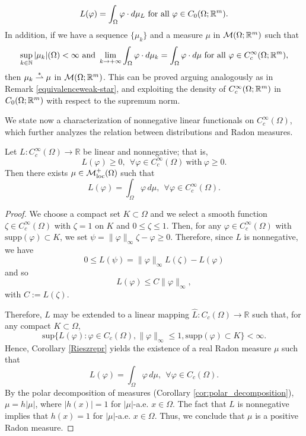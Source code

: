 \begin{remark}
\begin{equation*}
L(\varphi) = \int_{\Omega} \varphi \cdot d \mu_{L} \text{ for all } \varphi \in C_{0}(\Omega; \mathbb{R}^{m}).
\end{equation*}
In addition, if we have a sequence $\{\mu_{k}\}$ and a measure $\mu$ in $\mathcal{M}(\Omega; \mathbb{R}^{m})$ such that
\begin{equation*}
\sup_{k \in \mathbb{N}} |\mu_{k}|(\Omega) < \infty \text{ and } \lim_{k \to + \infty} \int_{\Omega} \varphi \cdot d \mu_{k} = \int_{\Omega} \varphi \cdot d \mu \text{ for all } \varphi \in C^{\infty}_{c}(\Omega; \mathbb{R}^{m}),
\end{equation*}
then $\mu_{k} \overset{*}{\rightharpoonup} \mu$ in $\mathcal{M}(\Omega; \mathbb{R}^{m})$. This can be proved arguing analogously as in Remark \ref{equivalenceweak-star}, and exploiting the density of $C^{\infty}_{c}(\Omega; \mathbb{R}^{m})$ in $C_{0}(\Omega; \mathbb{R}^{m})$ with respect to the supremum norm.
\end{remark}

We state now a characterization of nonnegative linear functionals on $C^{\infty}_{c}(\Omega)$, which further analyzes the relation between distributions and Radon measures.

\begin{lemma} \label{Schwartzlemma} Let $L : C^{\infty}_{c}(\Omega) \to \mathbb{R}$ be linear and nonnegative; that is, 
\[L(\varphi) \ge 0, \ \ \forall \varphi \in C^{\infty}_{c}(\Omega) \ \text{with} \ \varphi \ge 0.\] 
Then there exists $\mu \in \mathcal{M}_{\rm loc}^{+}(\Omega)$ such that
\[ L(\varphi) = \int_{\Omega} \varphi \, d \mu, \ \ \forall \varphi \in C^{\infty}_{c}(\Omega). \]
\end{lemma}
\begin{proof} We choose a compact set $K \subset \Omega$ and we select a smooth function $\zeta \in C^{\infty}_{c}(\Omega)$ with $\zeta = 1$ on $K$ and $0 \le \zeta \le 1$. Then, for any $\varphi \in C^{\infty}_{c}(\Omega)$ with $\mathrm{supp}(\varphi) \subset K$, we set $\psi = \|\varphi\|_{\infty} \zeta - \varphi \ge 0$. Therefore, since $L$ is nonnegative, we have $$0 \le L(\psi) = \|\varphi\|_{\infty} L(\zeta) - L(\varphi)$$ and so $$L(\varphi) \le C \|\varphi\|_{\infty},$$ with $C := L(\zeta)$.

Therefore, $L$ may be extended to a linear mapping $\widehat{L} : C_{c}(\Omega) \to \mathbb{R}$ such that, for any compact $K \subset \Omega$, 
\[ \mathrm{sup} \{ L(\varphi) : \varphi \in C_{c} (\Omega), \|\varphi\|_{\infty} \le 1, \mathrm{supp}(\varphi) \subset K \} < \infty. \]
Hence, Corollary \ref{Rieszrepr} yields the existence of a real Radon measure $\mu$ such that
\[ L(\varphi) = \int_{\Omega} \varphi \, d \mu, \ \ \forall \varphi \in C_{c}(\Omega). \]
By the polar decomposition of measures (Corollary \ref{cor:polar_decomposition}), $\mu = h |\mu|$, where $|h(x)| = 1$ for $|\mu|$-a.e. $x \in \Omega$. The fact that $L$ is nonnegative implies that $h(x) = 1$ for $|\mu|$-a.e. $x \in \Omega$. Thus, we conclude that $\mu$ is a positive Radon measure. 
\end{proof}


